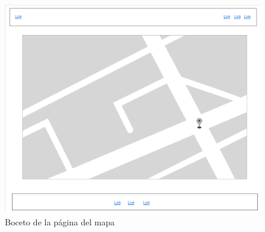 \newpage

\begin{figure}[!ht]
  \begin{center}
  \includegraphics[scale=0.65]{../images/diag_plan/ui_mapa.png}
  \caption{Boceto de la página del mapa}
  \label{fig:ar_rsmap}
  \end{center}
\end{figure}
